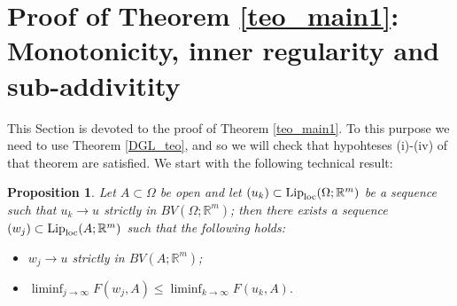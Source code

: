 \documentclass[a4paper,11pt]{article}
\numberwithin{equation}{section}
\newtheorem{prop}[theorem]{Proposition}
\newcommand{\Om}{\Omega}
\newcommand{\R}{\mathbb{R}}
\begin{document}
\section{Proof of Theorem \ref{teo_main1}: Monotonicity, inner regularity and sub-addivitity}\label{sec_proof}
This Section is devoted to the proof of Theorem \ref{teo_main1}. To this purpose we need to use Theorem \ref{DGL_teo}, and so we will check that hypohteses (i)-(iv) of that theorem are satisfied. We start with the following technical result: 
\begin{prop}\label{prop31}
	Let $A\subset\Om$ be open and let $(u_k)\subset \text{{\rm Lip}}_{\text{{\rm loc}}}(\Om;\R^m)$ be a sequence such that $u_k\rightarrow u$ strictly in $BV(\Om;\R^m)$; then there exists a sequence $(w_j)\subset \text{{\rm Lip}}_{\text{{\rm loc}}}(A;\R^m)$ such that the following holds:
	\begin{itemize}
\item[(i)] $w_j\rightarrow u$ strictly in $BV(A;\R^m)$;
\item[(ii)] $\liminf_{j\rightarrow \infty}F(w_j,A)\leq \liminf_{k\rightarrow \infty}F(u_k,A).$
	\end{itemize}





\end{prop}
\end{document}
